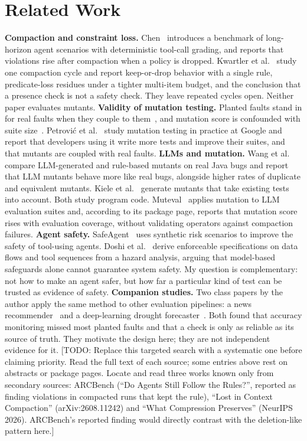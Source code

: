 \documentclass[10pt]{article}
\theoremstyle{definition}
\newcommand{\todo}[1]{\textcolor{BrickRed}{[TODO: #1]}}
\begin{document}
\section{Related Work}

\textbf{Compaction and constraint loss.} Chen~\cite{chen2026} introduces a benchmark of long-horizon agent scenarios with deterministic tool-call grading, and reports that violations rise after compaction when a policy is dropped. Kwartler et al.~\cite{kwartler2026} study one compaction cycle and report keep-or-drop behavior with a single rule, predicate-loss residues under a tighter multi-item budget, and the conclusion that a presence check is not a safety check. They leave repeated cycles open. Neither paper evaluates mutants.
\textbf{Validity of mutation testing.} Planted faults stand in for real faults when they couple to them~\cite{just2014}, and mutation score is confounded with suite size~\cite{papadakis2018}. Petrovi\'c et al.~\cite{petrovic2021} study mutation testing in practice at Google and report that developers using it write more tests and improve their suites, and that mutants are coupled with real faults.
\textbf{LLMs and mutation.} Wang et al.~\cite{wang2024} compare LLM-generated and rule-based mutants on real Java bugs and report that LLM mutants behave more like real bugs, alongside higher rates of duplicate and equivalent mutants. Kiele et al.~\cite{kiele2026} generate mutants that take existing tests into account. Both study program code. Muteval~\cite{muteval} applies mutation to LLM evaluation suites and, according to its package page, reports that mutation score rises with evaluation coverage, without validating operators against compaction failures.
\textbf{Agent safety.} SafeAgent~\cite{zhou2026} uses synthetic risk scenarios to improve the safety of tool-using agents. Doshi et al.~\cite{doshi2026} derive enforceable specifications on data flows and tool sequences from a hazard analysis, arguing that model-based safeguards alone cannot guarantee system safety. My question is complementary: not how to make an agent safer, but how far a particular kind of test can be trusted as evidence of safety.
\textbf{Companion studies.} Two class papers by the author apply the same method to other evaluation pipelines: a news recommender~\cite{seumal2026rec} and a deep-learning drought forecaster~\cite{seumal2026drought}. Both found that accuracy monitoring missed most planted faults and that a check is only as reliable as its source of truth. They motivate the design here; they are not independent evidence for it.
\todo{Replace this targeted search with a systematic one before claiming priority. Read the full text of each source; some entries above rest on abstracts or package pages. Locate and read three works known only from secondary sources: ARCBench (``Do Agents Still Follow the Rules?'', reported as finding violations in compacted runs that kept the rule), ``Lost in Context Compaction'' (arXiv:2608.11242) and ``What Compression Preserves'' (NeurIPS 2026). ARCBench's reported finding would directly contrast with the deletion-like pattern here.}
\end{document}
